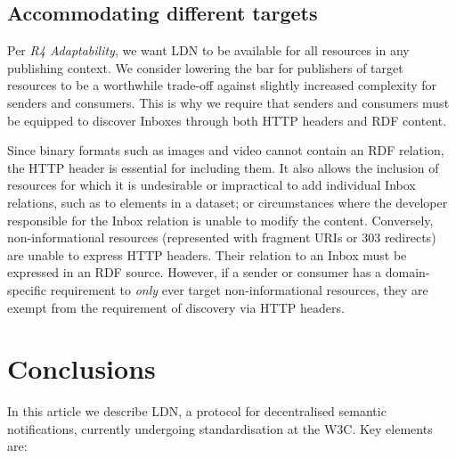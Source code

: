                             

                            
                                \subsection{Accommodating different targets}
  \label{accommodating-different-targets}

                                
                                    
\par Per {\em R4 Adaptability}, we want LDN to be available for all resources in any publishing context. We consider lowering the bar for publishers of target resources to be a worthwhile trade-off against slightly increased complexity for senders and consumers. This is why we require that senders and consumers must be equipped to discover Inboxes through both HTTP headers and RDF content. 

                                    
\par Since binary formats such as images and video cannot contain an RDF relation, the HTTP header is essential for including them. It also allows the inclusion of resources for which it is undesirable or impractical to add individual Inbox relations, such as to elements in a dataset; or circumstances where the developer responsible for the Inbox relation is unable to modify the content. Conversely, non-informational resources (represented with fragment URIs or 303 redirects) are unable to express HTTP headers. Their relation to an Inbox must be expressed in an RDF source. However, if a sender or consumer has a domain-specific requirement to {\em only} ever target non-informational resources, they are exempt from the requirement of discovery via HTTP headers.
                                
                            
                        
                    

                    
                        \section{Conclusions}
  \label{conclusions}

                        
                            
\par In this article we describe LDN, a protocol for decentralised semantic notifications, currently undergoing standardisation at the W3C. Key elements are:

